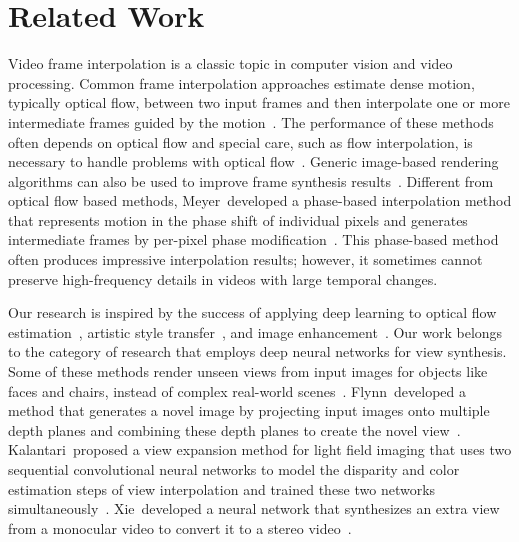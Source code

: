 \documentclass[10pt,twocolumn,letterpaper]{article}
\begin{document}
\section{Related Work}
\label{sec:related}
Video frame interpolation is a classic topic in computer vision and video processing. Common frame interpolation approaches estimate dense motion, typically optical flow, between two input frames and then interpolate one or more intermediate frames guided by the motion~\cite{Baker_OTHER_2011, Werlberger_OTHER_2011, Yu_OTHER_2013}. The performance of these methods often depends on optical flow and special care, such as flow interpolation, is necessary to handle problems with optical flow~\cite{Baker_OTHER_2011}. Generic image-based rendering algorithms can also be used to improve frame synthesis results~\cite{Mahajan_TOG_2009, Zitnick_TOG_2004}. Different from optical flow based methods, Meyer~\etal developed a phase-based interpolation method that represents motion in the phase shift of individual pixels and generates intermediate frames by per-pixel phase modification~\cite{Meyer_CVPR_2015}. This phase-based method often produces impressive interpolation results; however, it sometimes cannot preserve high-frequency details in videos with large temporal changes.

Our research is inspired by the success of applying deep learning to optical flow estimation~\cite{Bailer_ICCV_2015, Dosovitskiy_ICCV_2015, Gadot_CVPR_2015, Guney_ACCV_2016, Teney_CORR_2016, Tran_CVPR_2015, Weinzaepfel_ICCV_2013}, artistic style transfer~\cite{Gatys_CVPR_2016, Johnson_ECCV_2016, Li_ECCV_2016}, and image enhancement~\cite{Burger_CVPR_2012, Dong_ICCV_2015, Dong_PAMI_2016, Jiansun_CVPR_2015, Svoboda_CORR_2016, Xie_NIPS_2012, Xu_NIPS_2014, Zhang_ECCV_2016, Zhu_ECCV_2016}. Our work belongs to the category of research that employs deep neural networks for view synthesis. Some of these methods render unseen views from input images for objects like faces and chairs, instead of complex real-world scenes~\cite{Dosovitskiy_CVPR_2015, Kulkarni_NIPS_2015, Tatarchenko_ECCV_2016, Yang_NIPS_2015}. Flynn~\etal developed a method that generates a novel image by projecting input images onto multiple depth planes and combining these depth planes to create the novel view~\cite{Flynn_CVPR_2016}. Kalantari~\etal proposed a view expansion method for light field imaging that uses two sequential convolutional neural networks to model the disparity and color estimation steps of view interpolation and trained these two networks simultaneously~\cite{Kalantari_TOG_2016}. Xie~\etal developed a neural network that synthesizes an extra view from a monocular video to convert it to a stereo video~\cite{Xie_ECCV_2016}.
\end{document}
